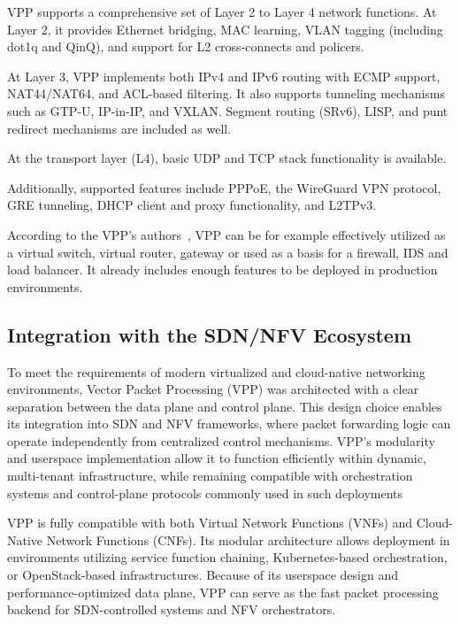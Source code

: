 VPP supports a comprehensive set of Layer 2 to Layer 4 network functions. 
At Layer 2, it provides Ethernet bridging, MAC learning, VLAN tagging (including dot1q and QinQ), and support for L2 cross-connects and policers.

At Layer 3, VPP implements both IPv4 and IPv6 routing with ECMP support, NAT44/NAT64, and ACL-based filtering. 
It also supports tunneling mechanisms such as GTP-U, IP-in-IP, and VXLAN. Segment routing (SRv6), LISP, and punt redirect mechanisms are included as well.

At the transport layer (L4), basic UDP and TCP stack functionality is available. 

Additionally, supported features include PPPoE, the WireGuard VPN protocol, GRE tunneling, DHCP client and proxy functionality, and L2TPv3.~\cite{fdio-vpp-features-2502}

According to the VPP's authors~\cite{fdio_what_is_vpp}, VPP can be for example effectively utilized as a virtual switch, virtual router, gateway or used as a basis for a firewall, IDS and load balancer.
It already includes enough features to be deployed in production environments.


\subsection{Integration with the SDN/NFV Ecosystem}
To meet the requirements of modern virtualized and cloud-native networking environments, Vector Packet Processing (VPP) was architected with a clear separation between the data plane and control plane. 
This design choice enables its integration into SDN and NFV frameworks, where packet forwarding logic can operate independently from centralized control mechanisms. 
VPP's modularity and userspace implementation allow it to function efficiently within dynamic, multi-tenant infrastructure, 
while remaining compatible with orchestration systems and control-plane protocols commonly used in such deployments

VPP is fully compatible with both Virtual Network Functions (VNFs) and Cloud-Native Network Functions (CNFs). 
Its modular architecture allows deployment in environments utilizing service function chaining, Kubernetes-based orchestration, or OpenStack-based infrastructures. 
Because of its userspace design and performance-optimized data plane, VPP can serve as the fast packet processing backend for SDN-controlled systems and NFV orchestrators.~\cite{fdio2017whitepaper}

